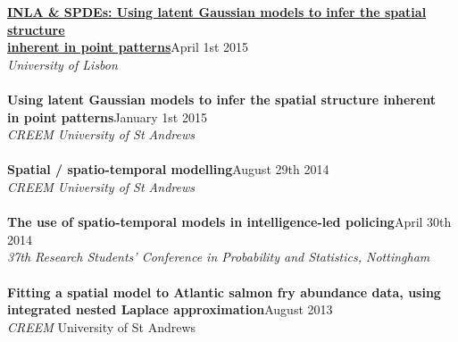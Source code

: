 \documentclass[10pt,letter]{article}
\begin{document}
\href{https://drive.google.com/file/d/0B03uSZ5TT4NYanE4N2N6THMtZ28/view?usp=sharing} {\textbf{INLA \& SPDEs: Using latent Gaussian models to infer the spatial structure \\
inherent in point patterns}}\hfill April 1st 2015\\
 {\sl University of Lisbon}\\
 \hdashrule[0.5ex]{4cm}{1pt}{1pt}\\
 {\textbf{Using latent Gaussian models to infer the spatial
structure inherent \\in point patterns}}\hfill January 1st 2015\\
 {\sl CREEM University of St Andrews}\\
 \hdashrule[0.5ex]{4cm}{1pt}{1pt}\\
 {\textbf{Spatial / spatio-temporal modelling}}\hfill August 29th 2014\\
 {\sl CREEM University of St Andrews}\\
 \hdashrule[0.5ex]{4cm}{1pt}{1pt}\\

{\textbf{The use of spatio-temporal models in intelligence-led policing}}\hfill  April 30th 2014\\
 {\sl 37th Research Students' Conference in Probability and Statistics, Nottingham}\\
 \hdashrule[0.5ex]{4cm}{1pt}{1pt}\\
{\textbf{Fitting a spatial model to Atlantic salmon fry abundance data, using\\ integrated nested Laplace approximation}}\hfill  August 2013\\
 {\sl CREEM} University of St Andrews\\ 
\end{document}
